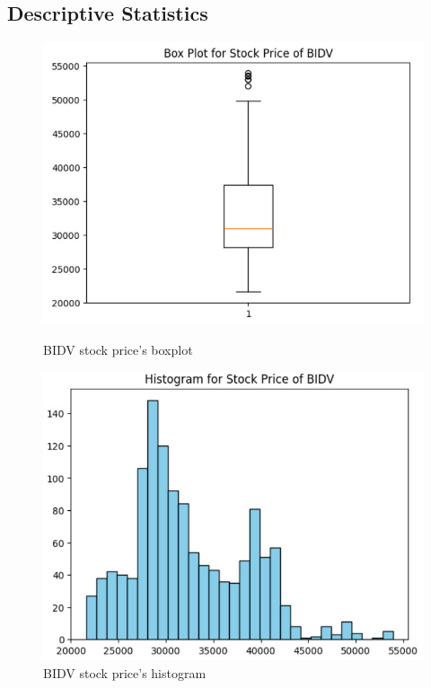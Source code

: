 \subsection{Descriptive Statistics}
\begin{figure}[H]
    \centering
    \begin{minipage}{0.23\textwidth}
    \centering
    \includegraphics[width=1\textwidth]{resources/chapter-3/Boxplot_BIDV.jpg}
    \caption{BIDV stock price's boxplot}
    \label{fig:bidv_boxplot}
    \end{minipage}
    \hfill
    \begin{minipage}{0.23\textwidth}
    \centering
    \includegraphics[width=1\textwidth]{resources/chapter-3/Histogram_BIDV.jpg}
    \caption{BIDV stock price's histogram}
    \label{fig:bidv_histogram}
    \end{minipage}
\end{figure}

